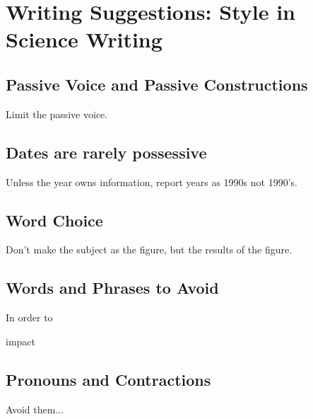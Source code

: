 \documentclass{tufte-handout}\usepackage[]{graphicx}\usepackage[]{color}
\begin{document}


\section{Writing Suggestions: Style in Science Writing}

\subsection{Passive Voice and Passive Constructions}

Limit the passive voice.

\subsection{Dates are rarely possessive}

Unless the year owns information, report years as 1990s not 1990's. 

\subsection{Word Choice}

Don't make the subject as the figure, but the results of the figure.

\subsection{Words and Phrases to Avoid}

In order to

impact



\subsection{Pronouns and Contractions}

Avoid them...
\end{document}
